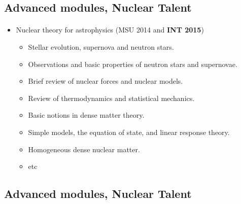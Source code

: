 \documentclass[%
twoside,                 %
final,                   %
10pt]{article}
\begin{document}
\noindent



\subsection{Advanced  modules, Nuclear Talent}

\paragraph{}
\begin{itemize}
\item Nuclear theory for astrophysics (MSU 2014 and \textbf{INT 2015})
\begin{itemize}

  \item Stellar evolution, supernova and neutron stars.

  \item Observations and basic properties of neutron stars and supernovae.

  \item Brief review of nuclear forces and nuclear models.

  \item Review of thermodynamics and statistical mechanics.

  \item Basic notions in dense matter theory.

  \item Simple models, the equation of state, and linear response theory.

  \item Homogeneous dense nuclear matter.

  \item etc 
\end{itemize}

\noindent
\end{itemize}

\noindent



\subsection{Advanced  modules, Nuclear Talent}

\end{document}
